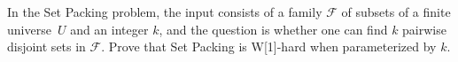 \documentclass[english]{uebung_cs}
\begin{document}
\begin{exercise}
  In the Set Packing problem, the input consists of a family \( \mathcal{F} \) of subsets of a finite universe~\( U \) and an integer \( k \), and the question is whether one can find \( k \) pairwise disjoint sets in \( \mathcal{F} \). Prove that Set Packing is \textnormal{W[1]}-hard when parameterized by \( k \).
\end{exercise}



\end{document}
